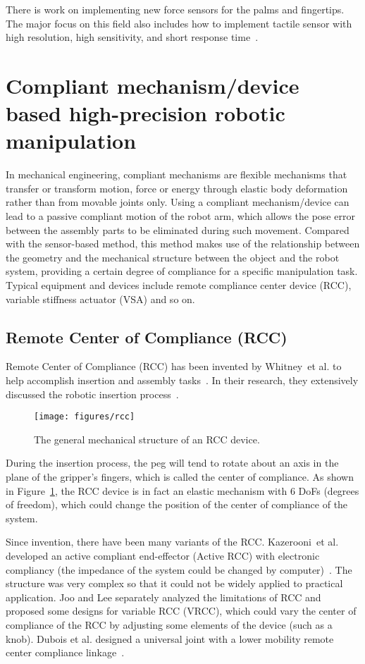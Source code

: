\documentclass[journal,twoside,web]{ieeecolor}
\begin{document}
There is work on implementing new force sensors for the palms and fingertips. 
The major focus on this field also includes how to implement tactile sensor with high resolution, high sensitivity, and short response time~\cite{Yin2018,Patel2018,Boutry2018,Hughes2018,Zhang2018}.

\section{Compliant mechanism/device based high-precision robotic manipulation}
\label{sec:compliant_dev}

In mechanical engineering, compliant mechanisms are flexible mechanisms that transfer or transform motion, force or energy through elastic body deformation rather than from movable joints only.
Using a compliant mechanism/device can lead to a passive compliant motion of the robot arm, which allows the pose error between the assembly parts to be eliminated during such movement.
Compared with the sensor-based method, this method makes use of the relationship between the geometry and the mechanical structure between the object and the robot system, providing a certain degree of compliance for a specific manipulation task. 
Typical equipment and devices include remote compliance center device (RCC), variable stiffness actuator (VSA) and so on.

\subsection{Remote Center of Compliance (RCC)}
\label{subsec:rcc}

Remote Center of Compliance (RCC) has been invented by Whitney~et al. to help accomplish insertion and assembly tasks~\cite{Whitney1986a}. 
In their research, they extensively discussed the robotic insertion process~\cite{Whitney1987}.
\begin{figure}[htb]
    \centering
    \texttt{[image: figures/rcc]}
    \caption{The general mechanical structure of an RCC device.}
    \label{fig:rcc}
\end{figure}
During the insertion process, the peg will tend to rotate about an axis in the plane of the gripper's fingers, which is called the center of compliance. 
As shown in Figure~\ref{fig:rcc}, the RCC device is in fact an elastic mechanism with 6 DoFs (degrees of freedom), which could change the position of the center of compliance of the system.


Since invention, there have been many variants of the RCC. 
Kazerooni~et al. developed an active compliant end-effector (Active RCC) with electronic compliancy (the impedance of the system could be changed by computer)~\cite{Kazerooni1988}. The structure was very complex so that it could not be widely applied to practical application.
Joo and Lee separately analyzed the limitations of RCC and proposed some designs for variable RCC (VRCC)\cite{Joo1998, Lee2005}, which could vary the center of compliance of the RCC by adjusting some elements of the device (such as a knob).
Dubois et al. designed a universal joint with a lower mobility remote center compliance linkage~\cite{Dubois2016}.
\end{document}
